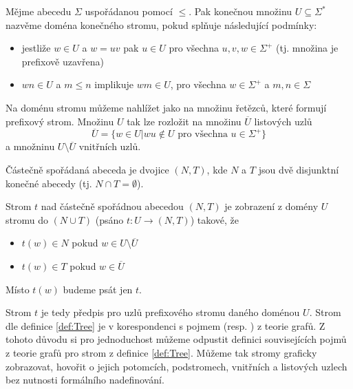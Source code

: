 \documentclass[a4paper,10pt]{article}
\begin{document}
\begin{definition}
  Mějme abecedu $\Sigma$ uspořádanou pomocí $\leq$. Pak konečnou množinu $U \subseteq \Sigma^*$ nazvěme doména konečného stromu, pokud splňuje následující podmínky:
  \begin{itemize}
   \item jestliže $w \in U$ a $w = uv$ pak $u \in U$ pro všechna $u, v, w \in \Sigma^+$ (tj. množina je prefixově uzavřena)
   \item $wn \in U$ a $m \leq n$ implikuje $wm \in U$, pro všechna $w \in \Sigma^+$ a $m, n \in \Sigma$
  \end{itemize}
\end{definition}
 Na doménu stromu můžeme nahlížet jako na množinu řetězců, které formují prefixový strom. Množinu $U$ tak lze rozložit na množinu $\overline{U}$ listových uzlů 
$$
 \overline{U} = \{ w \in U | w u \notin U \text{ pro všechna } u \in \Sigma^+ \}
$$
a množninu $U \setminus \overline{U}$ vnitřních uzlů.

\begin{definition}
  Částečně spořádaná abeceda je dvojice $(N, T)$, kde $N$ a $T$ jsou dvě disjunktní konečné abecedy (tj. $N \cap T = \emptyset$).
\end{definition}

\begin{definition}[Strom] \label{def:Tree}
 Strom $t$ nad částečně spořádnou abecedou $(N, T)$ je zobrazení z domény $U$ stromu do $(N \cup T) $ (psáno $t: U \rightarrow (N, T)$) takové, že
 \begin{itemize}
  \item $t(w) \in N$ pokud $w \in U \setminus \overline{U}$
  \item $t(w) \in T$ pokud $w \in \overline{U}$
 \end{itemize}
 Místo $t(w)$ budeme psát jen $t$.
\end{definition}
Strom $t$ je tedy předpis pro  uzlů prefixového stromu daného doménou $U$. Strom dle definice \ref{def:Tree} je v korespondenci s pojmem  (resp. ) z teorie grafů. Z tohoto důvodu si pro jednoduchost můžeme odpustit definici souvisejících pojmů z teorie grafů pro strom z definice \ref{def:Tree}. Můžeme tak stromy graficky zobrazovat, hovořit o jejich potomcích, podstromech, vnitřních a listových uzlech bez nutnosti formálního nadefinování.
\end{document}
